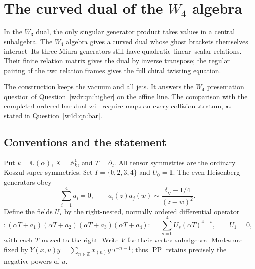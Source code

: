 \chapter{The curved dual of the \texorpdfstring{$W_4$}{W4} algebra}
\label{w4d:chapter}
\begingroup
\newcommand{\wfourword}[4]{\langle #1,#2;#3,#4\rangle}
\newcommand{\wfourpair}[2]{\mathopen{:}#1#2\mathclose{:}}

In the $W_3$ dual, the only singular generator product takes values in a
central subalgebra. The $W_4$ algebra gives a curved dual whose ghost
brackets themselves interact. Its three Miura generators still have
quadratic--linear--scalar relations. Their finite relation matrix gives
the dual by inverse transpose; the regular pairing of the two relation
frames gives the full chiral twisting equation.

The construction keeps the vacuum and all jets. It answers the $W_4$
presentation question of Question~\ref{wdr:qn:higher} on the affine line.
The comparison with the completed ordered bar dual will require maps on
every collision stratum, as stated in Question~\ref{w4d:qn:bar}.

\section{Conventions and the statement}
Put $k=\mathbb C(\alpha)$, $X=\mathbb A^1_k$, and $T=\partial_z$. All tensor symmetries are the ordinary Koszul super symmetries. Set $I=\{0,2,3,4\}$ and $U_0=\mathbf1$. The even Heisenberg generators obey
\[
 \sum_{i=1}^4a_i=0,\qquad
 a_i(z)a_j(w)\sim\frac{\delta_{ij}-1/4}{(z-w)^2}.
\]
Define the fields $U_s$ by the right-nested, normally ordered differential operator
\[
 :\!(\alpha T+a_1)(\alpha T+a_2)(\alpha T+a_3)(\alpha T+a_4)\!:
   =\sum_{s=0}^4 U_s(\alpha T)^{4-s},
 \qquad U_1=0,
\]
with each $T$ moved to the right. Write $V$ for their vertex subalgebra. Modes are fixed by
$Y(x,u)y=\sum_{n\in\mathbb Z}x_{(n)}y\,u^{-n-1}$; thus $\operatorname{PP}$ retains precisely the negative powers of $u$.

